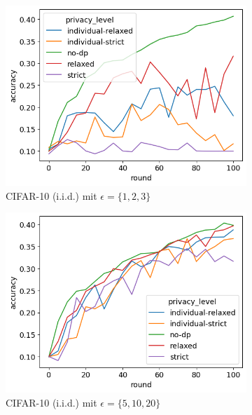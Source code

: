 \begin{figure}[tb]
	\centering
	\begin{subfigure}{0.45\textwidth}
		\centering
		\includegraphics[width=\linewidth]{Bilder/cifar10-accuracy-iid-eps-1-2-3.png}
		\caption{CIFAR-10 (i.i.d.) mit $\epsilon = \{1,2,3\}$}
	\end{subfigure}
	\begin{subfigure}{0.45\textwidth}
		\centering
		\includegraphics[width=\linewidth]{Bilder/cifar10-accuracy-iid-eps-5-10-20.png}
		\caption{CIFAR-10 (i.i.d.) mit $\epsilon = \{5,10,20\}$}
	\end{subfigure}
	\begin{subfigure}{0.45\textwidth}
		\centering

\end{subfigure}
\end{figure}
